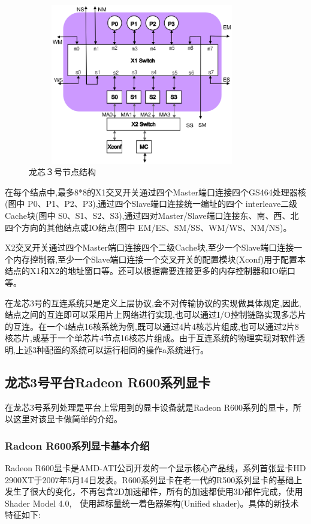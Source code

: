 \begin{figure}[H] 
  \centering
  \includegraphics[width=10cm,height=7cm]{figures/chap02/Loongson3-Node-Struct}
  \caption{龙芯３号节点结构}
  \label{fig:Loongson3-Node-Struct}
\end{figure}

在每个结点中,最多8*8的X1交叉开关通过四个Master端口连接四个GS464处理器核(图中 P0、P1、P2、P3),通过四个Slave端口连接统一编址的四个 interleave二级Cache块(图中 S0、S1、S2、S3),通过四对Master/Slave端口连接东、南、西、北四个方向的其他结点或IO结点(图中 EM/ES、SM/SS、WM/WS、NM/NS)。

X2交叉开关通过四个Master端口连接四个二级Cache块,至少一个Slave端口连接一个内存控制器,至少一个Slave端口连接一个交叉开关的配置模块(Xconf)用于配置本结点的X1和X2的地址窗口等。还可以根据需要连接更多的内存控制器和IO端口等。

在龙芯3号的互连系统只是定义上层协议,会不对传输协议的实现做具体规定,因此,结点之间的互连即可以采用片上网络进行实现,也可以通过I/O控制链路实现多芯片的互连。在一个4结点16核系统为例,既可以通过4片4核芯片组成,也可以通过2片8核芯片,或基于一个单芯片4节点16核芯片组成。由于互连系统的物理实现对软件透明,上述3种配置的系统可以运行相同的操作a系统进行。

\subsection{龙芯3号平台Radeon R600系列显卡}

在龙芯3号系列处理是平台上常用到的显卡设备就是Radeon R600系列的显卡，所以这里对该显卡做简单的介绍。

\subsubsection{Radeon R600系列显卡基本介绍}

Radeon R600显卡是AMD-ATI公司开发的一个显示核心产品线，系列首张显卡HD 2900XT于2007年5月14日发表。R600系列显卡在老一代的R500系列显卡的基础上发生了很大的变化，不再包含2D加速部件，所有的加速都使用3D部件完成，使用Shader Model 4.0,　使用超标量统一着色器架构(Unified shader)。具体的新技术特征如下:

